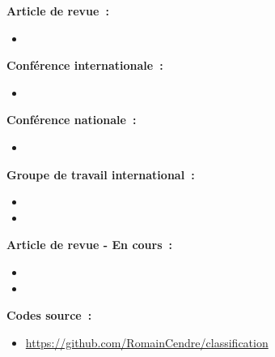 \textbf{Article de revue~:}
\vspace{-0.1cm}
\begin{itemize}
    \item {}
\end{itemize}

\textbf{Conférence internationale~:}
\vspace{-0.2cm}
\begin{itemize}
    \item {}
\end{itemize}

\textbf{Conférence nationale~:}
\vspace{-0.2cm}
\begin{itemize}
    \item {}
\end{itemize}

\textbf{Groupe de travail international~:}
\vspace{-0.2cm}
\begin{itemize}
    \item {}
    \item {}
\end{itemize}

\textbf{Article de revue - En cours~:}
\vspace{-0.1cm}
\begin{itemize}
    \item {}
    \item {}
\end{itemize}

\textbf{Codes source~:}
\vspace{-0.2cm}
\begin{itemize}
    \item \href{https://github.com/RomainCendre/classification}{https://github.com/RomainCendre/classification}
\end{itemize}